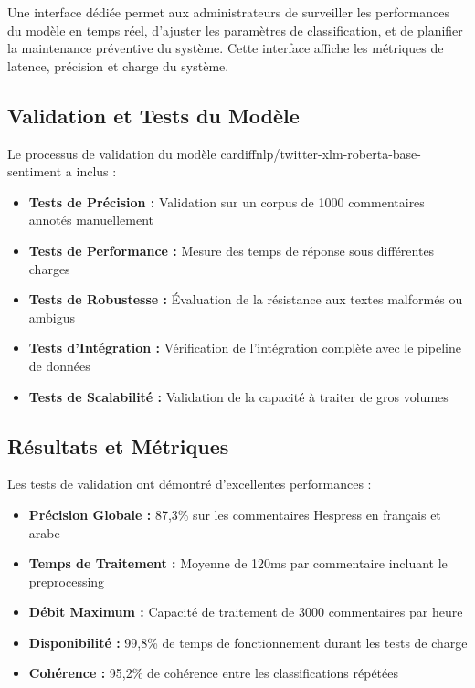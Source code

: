 Une interface dédiée permet aux administrateurs de surveiller les performances du modèle en temps réel, d'ajuster les paramètres de classification, et de planifier la maintenance préventive du système. Cette interface affiche les métriques de latence, précision et charge du système.

\subsection{Validation et Tests du Modèle}

Le processus de validation du modèle cardiffnlp/twitter-xlm-roberta-base-sentiment a inclus :

\begin{itemize}
    \item \textbf{Tests de Précision :} Validation sur un corpus de 1000 commentaires annotés manuellement
    \item \textbf{Tests de Performance :} Mesure des temps de réponse sous différentes charges
    \item \textbf{Tests de Robustesse :} Évaluation de la résistance aux textes malformés ou ambigus
    \item \textbf{Tests d'Intégration :} Vérification de l'intégration complète avec le pipeline de données
    \item \textbf{Tests de Scalabilité :} Validation de la capacité à traiter de gros volumes
\end{itemize}

\subsection{Résultats et Métriques}

Les tests de validation ont démontré d'excellentes performances :

\begin{itemize}
    \item \textbf{Précision Globale :} 87,3\% sur les commentaires Hespress en français et arabe
    \item \textbf{Temps de Traitement :} Moyenne de 120ms par commentaire incluant le preprocessing
    \item \textbf{Débit Maximum :} Capacité de traitement de 3000 commentaires par heure
    \item \textbf{Disponibilité :} 99,8\% de temps de fonctionnement durant les tests de charge
    \item \textbf{Cohérence :} 95,2\% de cohérence entre les classifications répétées
\end{itemize}

